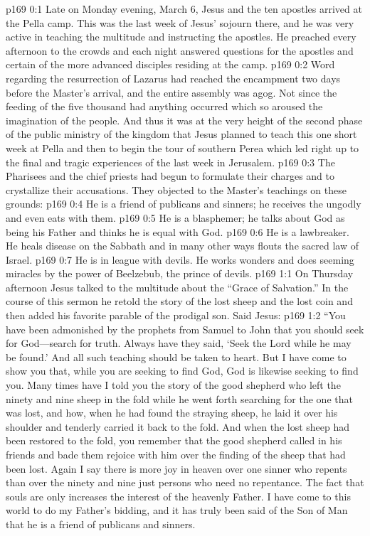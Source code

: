 \author{Midwayer Commission}
\vs p169 0:1 Late on Monday evening, March 6, Jesus and the ten apostles arrived at the Pella camp. This was the last week of Jesus’ sojourn there, and he was very active in teaching the multitude and instructing the apostles. He preached every afternoon to the crowds and each night answered questions for the apostles and certain of the more advanced disciples residing at the camp.
\vs p169 0:2 Word regarding the resurrection of Lazarus had reached the encampment two days before the Master’s arrival, and the entire assembly was agog. Not since the feeding of the five thousand had anything occurred which so aroused the imagination of the people. And thus it was at the very height of the second phase of the public ministry of the kingdom that Jesus planned to teach this one short week at Pella and then to begin the tour of southern Perea which led right up to the final and tragic experiences of the last week in Jerusalem.
\pc \vs p169 0:3 The Pharisees and the chief priests had begun to formulate their charges and to crystallize their accusations. They objected to the Master’s teachings on these grounds:
\pc \vs p169 0:4 \bibnobreakspace He is a friend of publicans and sinners; he receives the ungodly and even eats with them.
\vs p169 0:5 \bibnobreakspace He is a blasphemer; he talks about God as being his Father and thinks he is equal with God.
\vs p169 0:6 \bibnobreakspace He is a lawbreaker. He heals disease on the Sabbath and in many other ways flouts the sacred law of Israel.
\vs p169 0:7 \bibnobreakspace He is in league with devils. He works wonders and does seeming miracles by the power of Beelzebub, the prince of devils.
\vs p169 1:1 On Thursday afternoon Jesus talked to the multitude about the “Grace of Salvation.” In the course of this sermon he retold the story of the lost sheep and the lost coin and then added his favorite parable of the prodigal son. Said Jesus:
\pc \vs p169 1:2 \textcolor{ubdarkred}{“You have been admonished by the prophets from Samuel to John that you should seek for God---search for truth. Always have they said, ‘Seek the Lord while he may be found.’ And all such teaching should be taken to heart. But I have come to show you that, while you are seeking to find God, God is likewise seeking to find you. Many times have I told you the story of the good shepherd who left the ninety and nine sheep in the fold while he went forth searching for the one that was lost, and how, when he had found the straying sheep, he laid it over his shoulder and tenderly carried it back to the fold. And when the lost sheep had been restored to the fold, you remember that the good shepherd called in his friends and bade them rejoice with him over the finding of the sheep that had been lost. Again I say there is more joy in heaven over one sinner who repents than over the ninety and nine just persons who need no repentance. The fact that souls are  only increases the interest of the heavenly Father. I have come to this world to do my Father’s bidding, and it has truly been said of the Son of Man that he is a friend of publicans and sinners.}
